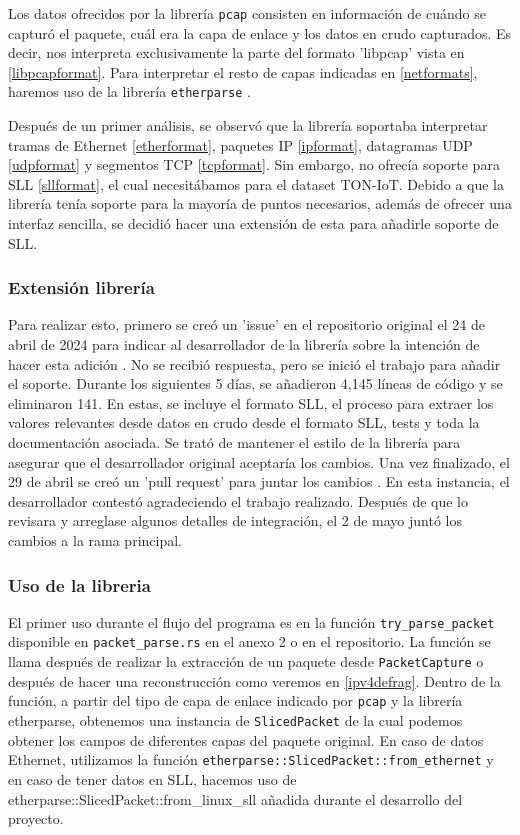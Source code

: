 Los datos ofrecidos por la librería \texttt{pcap} consisten en información de cuándo se capturó el paquete, cuál era la capa de enlace y los datos en crudo capturados. Es decir, nos interpreta exclusivamente la parte del formato 'libpcap' vista en \ref{libpcapformat}. Para interpretar el resto de capas indicadas en \ref{netformats}, haremos uso de la librería \texttt{etherparse} \cite{etherparse}.

Después de un primer análisis, se observó que la librería soportaba interpretar tramas de Ethernet \ref{etherformat}, paquetes IP \ref{ipformat}, datagramas UDP \ref{udpformat} y segmentos TCP \ref{tcpformat}. Sin embargo, no ofrecía soporte para SLL \ref{sllformat}, el cual necesitábamos para el dataset TON-IoT. Debido a que la librería tenía soporte para la mayoría de puntos necesarios, además de ofrecer una interfaz sencilla, se decidió hacer una extensión de esta para añadirle soporte de SLL. 

\subsubsection{Extensión librería}

Para realizar esto, primero se creó un 'issue' en el repositorio original el 24 de abril de 2024 para indicar al desarrollador de la librería sobre la intención de hacer esta adición \cite{slladdsllissue}. No se recibió respuesta, pero se inició el trabajo para añadir el soporte. Durante los siguientes 5 días, se añadieron 4,145 líneas de código y se eliminaron 141. En estas, se incluye el formato SLL, el proceso para extraer los valores relevantes desde datos en crudo desde el formato SLL, tests y toda la documentación asociada. Se trató de mantener el estilo de la librería para asegurar que el desarrollador original aceptaría los cambios. Una vez finalizado, el 29 de abril se creó un 'pull request' para juntar los cambios \cite{slladdsllpr}. En esta instancia, el desarrollador contestó agradeciendo el trabajo realizado. Después de que lo revisara y arreglase algunos detalles de integración, el 2 de mayo juntó los cambios a la rama principal.

\subsubsection{Uso de la libreria}

El primer uso durante el flujo del programa es en la función \texttt{try\_parse\_packet} disponible en \texttt{packet\_parse.rs} en el anexo 2 o en el repositorio. La función se llama después de realizar la extracción de un paquete desde \texttt{PacketCapture} o después de hacer una reconstrucción como veremos en \ref{ipv4defrag}. Dentro de la función, a partir del tipo de capa de enlace indicado por \texttt{pcap} y la librería etherparse, obtenemos una instancia de \texttt{SlicedPacket} de la cual podemos obtener los campos de diferentes capas del paquete original. En caso de datos Ethernet, utilizamos la función \texttt{etherparse::SlicedPacket::from\_ethernet} y en caso de tener datos en SLL, hacemos uso de {etherparse::SlicedPacket::from\_linux\_sll} añadida durante el desarrollo del proyecto.

